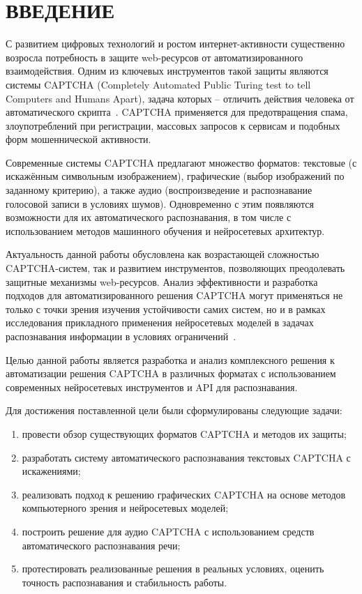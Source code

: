 \chapter*{ВВЕДЕНИЕ}

С развитием цифровых технологий и ростом интернет-активности существенно возросла 
потребность в защите web-ресурсов от автоматизированного взаимодействия. Одним 
из ключевых инструментов такой защиты являются системы CAPTCHA (Completely 
Automated Public Turing test to tell Computers and Humans Apart), задача которых 
-- отличить действия человека от автоматического скрипта~\cite{captchawiki}. 
CAPTCHA применяется для предотвращения спама, злоупотреблений при регистрации, 
массовых запросов к сервисам и подобных форм мошеннической активности.

Современные системы CAPTCHA предлагают множество форматов: текстовые (с 
искажённым символьным изображением), графические (выбор изображений по 
заданному критерию), а также аудио (воспроизведение и распознавание голосовой 
записи в условиях шумов). Одновременно с этим появляются возможности для их 
автоматического распознавания, в том числе с использованием методов 
машинного обучения и нейросетевых архитектур.

Актуальность данной работы обусловлена как возрастающей сложностью 
CAPTCHA-систем, так и развитием инструментов, позволяющих преодолевать защитные 
механизмы web-ресурсов. Анализ эффективности и разработка подходов для 
автоматизированного решения CAPTCHA могут применяться не только с точки зрения 
изучения устойчивости самих систем, но и в рамках исследования прикладного 
применения нейросетевых моделей в задачах распознавания информации в условиях 
ограничений~\cite{captchatrouble2}.

Целью данной работы является разработка и анализ комплексного решения к 
автоматизации решения CAPTCHA в различных форматах с использованием современных 
нейросетевых инструментов и API для распознавания.

Для достижения поставленной цели были сформулированы следующие задачи:

\begin{enumerate}
    \item провести обзор существующих форматов CAPTCHA и методов их защиты;
    \item разработать систему автоматического распознавания текстовых CAPTCHA с 
    искажениями;
    \item реализовать подход к решению графических CAPTCHA на основе методов 
    компьютерного зрения и нейросетевых моделей;
    \item построить решение для аудио CAPTCHA с использованием средств 
    автоматического распознавания речи;
    \item протестировать реализованные решения в реальных условиях, оценить 
    точность распознавания и стабильность работы.
\end{enumerate}
